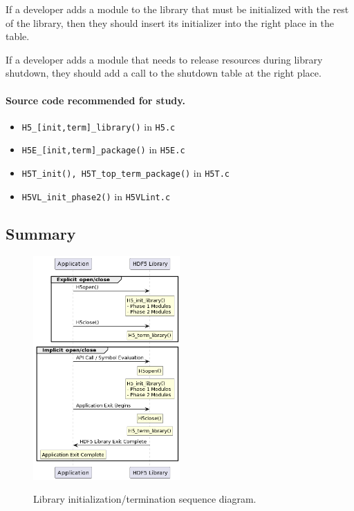 If a developer adds a module to the library that must be initialized with the rest of the library, then they should insert its initializer into the right place in the table.

If a developer adds a module that needs to release resources during library shutdown, they should add a call to the shutdown table at the right place.

\paragraph{Source code recommended for study.}

\begin{itemize}
    \item \texttt{H5\_[init,term]\_library()} in \texttt{H5.c}
    \item \texttt{H5E\_[init,term]\_package()} in \texttt{H5E.c}
    \item \texttt{H5T\_init(), H5T\_top\_term\_package()} in \texttt{H5T.c}
    \item \texttt{H5VL\_init\_phase2()} in \texttt{H5VLint.c}
\end{itemize}

\subsection{Summary}

\begin{figure}[h]
\centering
\includegraphics[width=0.5\textwidth]{images/tour_1_uml.png}
\label{fig:tour-1-uml}
\caption{Library initialization/termination sequence diagram.}
\end{figure}

